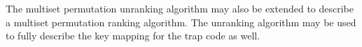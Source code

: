 The multiset permutation unranking algorithm may also be extended to describe a multiset permutation ranking algorithm. The unranking algorithm may be used to fully describe the key mapping for the trap code as well.





%




